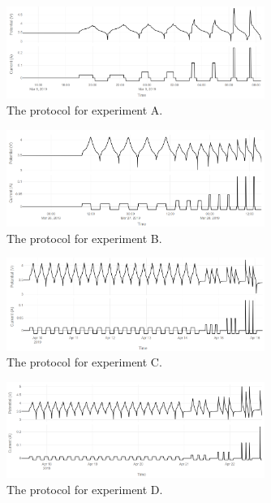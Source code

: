 \begin{figure}[t]\label{fig:neware0309}
    \includegraphics[width=0.75\textwidth]{Thesis/neware0309.PNG}
    \centering
    \caption{The protocol for experiment A.}
\end{figure}

\begin{figure}[t]\label{fig:neware0325}
    \includegraphics[width=0.75\textwidth]{Thesis/neware0325.PNG}
    \centering
    \caption{The protocol for experiment B.}
\end{figure}

\begin{figure}[t]\label{fig:neware0409}
    \includegraphics[width=0.75\textwidth]{Thesis/neware0409.PNG}
    \centering
    \caption{The protocol for experiment C.}
\end{figure}

\begin{figure}[t]\label{fig:neware0417}
    \includegraphics[width=0.75\textwidth]{Thesis/neware0417.PNG}
    \centering
    \caption{The protocol for experiment D.}
\end{figure}

